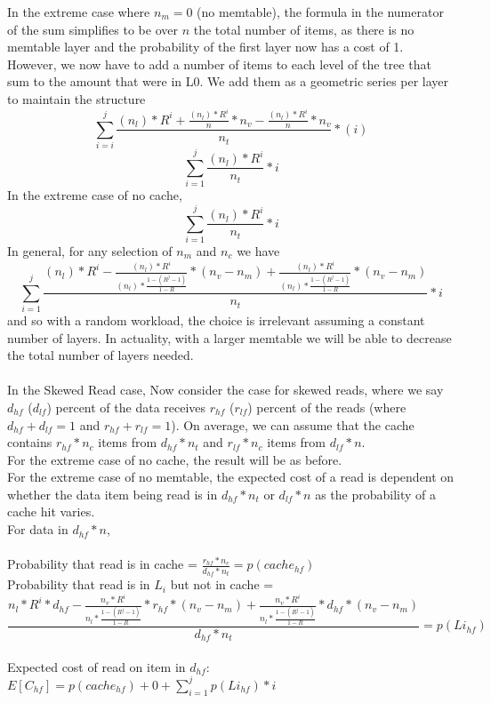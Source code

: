 \documentclass[11pt]{article}
\theoremstyle{plain}
\theoremstyle{definition}
\begin{document}
In the extreme case where $n_m=0$ (no memtable), the formula in the numerator of the sum simplifies to be over $n$ the total number of items, as there is no memtable layer and the probability of the first layer now has a cost of 1. However, we now have to add a number of items to each level of the tree that sum to the amount that were in L0. We add them as a geometric series per layer to maintain the structure
$$
\sum_{i=i}^{j} \frac{(n_l) * R^{i} + \frac{(n_l) * R^{i}}{n} * n_v - \frac{(n_l) * R^{i}}{n} * n_v}{n_t} * (i)
$$
$$
\sum_{i=1}^j \frac{(n_l) * R^i}{n_t} * i 
$$
In the extreme case of no cache, 
$$
\sum_{i=1}^j \frac{(n_l) * R^i}{n_t} * i 
$$
In general, for any selection of $n_m$ and $n_c$ we have
$$
\sum_{i=1}^j \frac{(n_l) * R^i - \frac{(n_l) * R^i}{(n_l) * \frac{1-(R^j-1)}{1-R}} * (n_v-n_m) + \frac{(n_l) * R^i}{(n_l) * \frac{1-(R^j-1)}{1-R}} * (n_v-n_m)}{n_t} * i 
$$
and so with a random workload, the choice is irrelevant assuming a constant number of layers. In actuality, with a larger memtable we will be able to decrease the total number of layers needed. \\
\\
In the Skewed Read case,
Now consider the case for skewed reads, where we say $d_{hf}$ ($d_{lf}$) percent of the data receives $r_{hf}$ ($r_{lf}$) percent of the reads (where $d_{hf} + d_{lf} = 1$ and $r_{hf} + r_{lf} = 1$). On average, we can assume that the cache contains $r_{hf} * n_c$ items from $d_{hf} * n_t$ and $r_{lf} * n_c$ items from $d_{lf} * n$. \\
For the extreme case of no cache, the result will be as before. \\
For the extreme case of no memtable, the expected cost of a read is dependent on whether the data item being read is in $d_{hf} * n_t$ or $d_{lf} * n$ as the probability of a cache hit varies.\\
For data in $d_{hf} * n$, \\ \\
Probability that read is in cache = $\frac{r_{hf} * n_c}{d_{hf} * n_t} = p(cache_{hf})$ \\
Probability that read is in $L_i$ but not in cache = 
$$ 
\frac{n_l * R^{i}*d_{hf} - \frac{n_v * R^{i}}{n_l * \frac{1-(R^j-1)}{1-R}} * r_{hf} * (n_v - n_m)+ \frac{n_v * R^{i}}{n_l * \frac{1-(R^j-1)}{1-R}} *d_{hf} *(n_v - n_m)}{d_{hf} * n_t}  = p(Li_{hf})
$$ \\
Expected cost of read on item in $d_{hf}$: $E[C_{hf}]= p(cache_{hf}) + 0 + \sum_{i=1}^j p(Li_{hf}) * i$\\ \\
\end{document}
